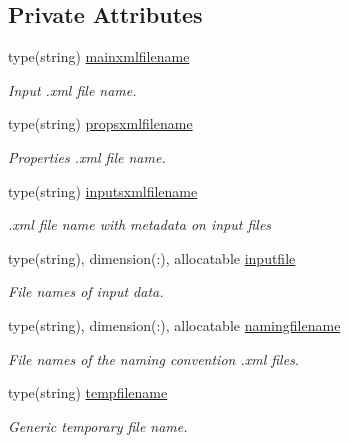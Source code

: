 \subsection*{Private Attributes}
\begin{DoxyCompactItemize}
\item 
type(string) \mbox{\hyperlink{structsimulationglobals__mod_1_1filenames__t_a5af6fa9ef520239ea544e0241a03259d}{mainxmlfilename}}
\begin{DoxyCompactList}\small\item\em Input .xml file name. \end{DoxyCompactList}\item 
type(string) \mbox{\hyperlink{structsimulationglobals__mod_1_1filenames__t_aa68e6aa970dcc2fb6ef62f5c20373948}{propsxmlfilename}}
\begin{DoxyCompactList}\small\item\em Properties .xml file name. \end{DoxyCompactList}\item 
type(string) \mbox{\hyperlink{structsimulationglobals__mod_1_1filenames__t_aef0d56123bd40e7f6a485680bad46345}{inputsxmlfilename}}
\begin{DoxyCompactList}\small\item\em .xml file name with metadata on input files \end{DoxyCompactList}\item 
type(string), dimension(\+:), allocatable \mbox{\hyperlink{structsimulationglobals__mod_1_1filenames__t_a28b7d9c5da2394c7a3ec6252bd95d9e4}{inputfile}}
\begin{DoxyCompactList}\small\item\em File names of input data. \end{DoxyCompactList}\item 
type(string), dimension(\+:), allocatable \mbox{\hyperlink{structsimulationglobals__mod_1_1filenames__t_ab9bfe3490032ac0fe0ff585f4ccf81ba}{namingfilename}}
\begin{DoxyCompactList}\small\item\em File names of the naming convention .xml files. \end{DoxyCompactList}\item 
type(string) \mbox{\hyperlink{structsimulationglobals__mod_1_1filenames__t_a65117f3cf40366162812c184decc8298}{tempfilename}}
\begin{DoxyCompactList}\small\item\em Generic temporary file name. \end{DoxyCompactList}\item 

\end{DoxyCompactItemize}
